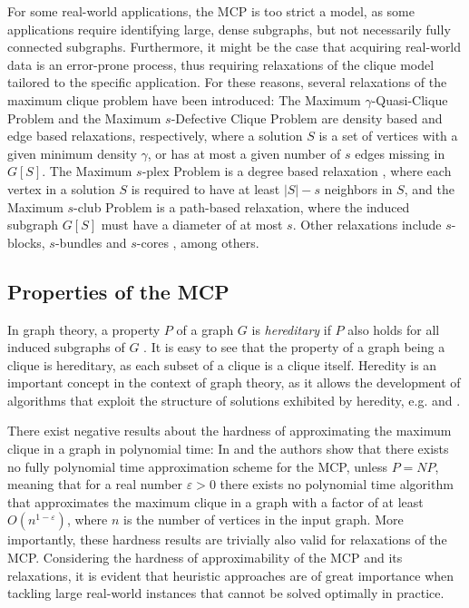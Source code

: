\documentclass[draft,final]{vutinfth} %
\begin{document}
For some real-world applications, the MCP is too strict a model, as some applications require identifying large, dense subgraphs, but not necessarily fully connected subgraphs. 
Furthermore, it might be the case that acquiring real-world data is an error-prone process, thus requiring relaxations of the clique model tailored to the specific application. 
For these reasons, several relaxations of the maximum clique problem have been introduced: The Maximum $\gamma$-Quasi-Clique Problem \cite{Abello2002} and the Maximum $s$-Defective Clique Problem \cite{Yu2006} are density based and edge based relaxations, respectively, where a solution $S$ is a set of vertices with a given minimum density $\gamma$, or has at most a given number of $s$ edges missing in $G[S]$. 
The Maximum $s$-plex Problem is a degree based relaxation \cite{Seidman1978}, where each vertex in a solution $S$ is required to have at least $|S| - s$ neighbors in $S$, and the Maximum $s$-club Problem \cite{Mokken1979} is a path-based relaxation, where the induced subgraph $G[S]$ must have a diameter of at most $s$. Other relaxations include $s$-blocks, $s$-bundles and $s$-cores \cite{Gschwind2015}, among others. 

\subsection{Properties of the MCP}

In graph theory, a property $P$ of a graph $G$ is \textit{hereditary} if $P$ also holds for all induced subgraphs of $G$ \cite{pattillo_maximum_2013}. It is easy to see that the property of a graph being a clique is hereditary, as each subset of a clique is a clique itself. Heredity is an important concept in the context of graph theory, as it allows the development of algorithms that exploit the structure of solutions exhibited by heredity, e.g. \cite{Trukhanov2013} and \cite{GSCHWIND2018131}.  

There exist negative results about the hardness of approximating the maximum clique in a graph in polynomial time: In \cite{Hastad1999} and \cite{Zuckerman2007} the authors show that there exists no fully polynomial time approximation scheme for the MCP, unless $\mathit{P} = \mathit{NP}$, meaning that for a real number $\varepsilon > 0$ there exists no polynomial time algorithm that approximates the maximum clique in a graph with a factor of at least $O(n^{1-\varepsilon})$, where $n$ is the number of vertices in the input graph. More importantly, these hardness results are trivially also valid for relaxations of the MCP. Considering the hardness of approximability of the MCP and its relaxations, it is evident that heuristic approaches are of great importance when tackling large real-world instances that cannot be solved optimally in practice. 
\end{document}
